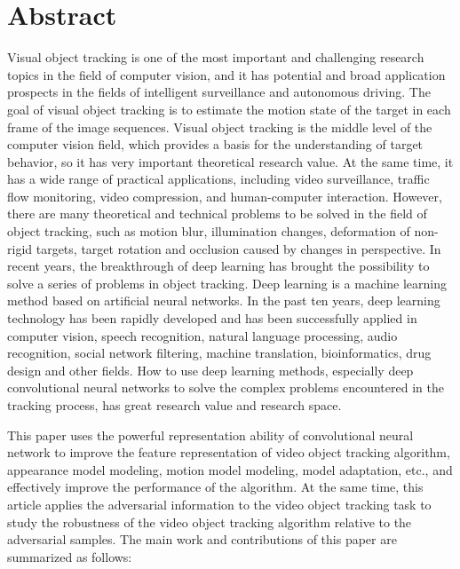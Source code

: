 
\intobmk\chapter*{Abstract}%

Visual object tracking is one of the most important and challenging research topics in the field of computer vision, and it has potential and broad application prospects in the fields of intelligent surveillance and autonomous driving. The goal of visual object tracking is to estimate the motion state of the target in each frame of the image sequences. Visual object tracking is the middle level of the computer vision field, which provides a basis for the understanding of target behavior, so it has very important theoretical research value. At the same time, it has a wide range of practical applications, including video surveillance, traffic flow monitoring, video compression, and human-computer interaction.
However, there are many theoretical and technical problems to be solved in the field of object tracking, such as motion blur, illumination changes, deformation of non-rigid targets, target rotation and occlusion caused by changes in perspective. In recent years, the breakthrough of deep learning has brought the possibility to solve a series of problems in object tracking.
Deep learning is a machine learning method based on artificial neural networks. In the past ten years, deep learning technology has been rapidly developed and has been successfully applied in computer vision, speech recognition, natural language processing, audio recognition, social network filtering, machine translation, bioinformatics, drug design and other fields. How to use deep learning methods, especially deep convolutional neural networks to solve the complex problems encountered in the tracking process, has great research value and research space.

This paper uses the powerful representation ability of convolutional neural network to improve the feature representation of video object tracking algorithm, appearance model modeling, motion model modeling, model adaptation, etc., and effectively improve the performance of the algorithm. At the same time, this article applies the adversarial information to the video object tracking task to study the robustness of the video object tracking algorithm relative to the adversarial samples. The main work and contributions of this paper are summarized as follows:

